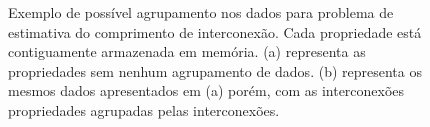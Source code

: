 \begin{figure}[ht]
    \centering

    \caption[Exemplo de agrupamento dos dados]{Exemplo de possível agrupamento nos dados para problema de estimativa do comprimento de interconexão. Cada propriedade está contiguamente armazenada em memória. (a) representa as propriedades sem nenhum agrupamento de dados. (b) representa os mesmos dados apresentados em (a) porém, com as interconexões propriedades agrupadas pelas interconexões.}
    \label{fig:sorting_data_example}
\end{figure}
